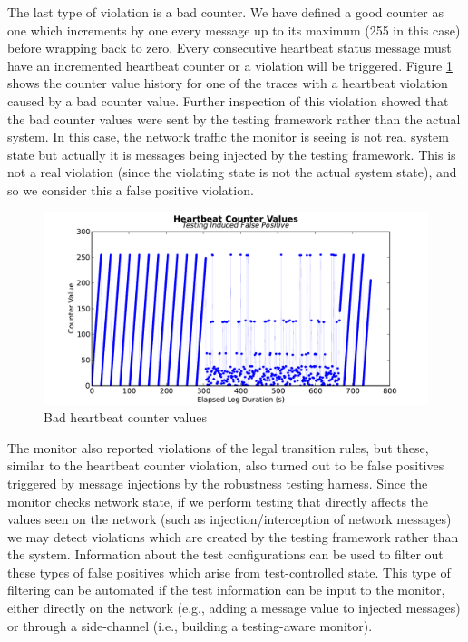 The last type of violation is a bad counter. 
We have defined a good counter as one which increments by one every message up to its maximum (255 in this case) before wrapping back to zero.
Every consecutive heartbeat status message must have an incremented heartbeat counter or a violation will be triggered. Figure \ref{fig:hb_badcounter} shows the counter value history for one of the traces with a heartbeat violation caused by a bad counter value.
%
Further inspection of this violation showed that the bad counter values were sent by the testing framework rather than the actual system. In this case, the network traffic the monitor is seeing is not real system state but actually it is messages being injected by the testing framework. This is not a real violation (since the violating state is not the actual system state), and so we consider this a false positive violation.


\begin{figure}
\includegraphics[width=4.5in]{img/hb2}
\caption{Bad heartbeat counter values \label{fig:hb_badcounter}}
\end{figure}

The monitor also reported violations of the legal transition rules, but these, similar to the heartbeat counter violation, also turned out to be false positives triggered by message injections by the robustness testing harness. Since the monitor checks network state, if we perform testing that directly affects the values seen on the network (such as injection/interception of network messages) we may detect violations which are created by the testing framework rather than the system. 
Information about the test configurations can be used to filter out these types of false positives which arise from test-controlled state.
This type of filtering can be automated if the test information can be input to the monitor, either directly on the network (e.g., adding a message value to injected messages) or through a side-channel (i.e., building a testing-aware monitor).
